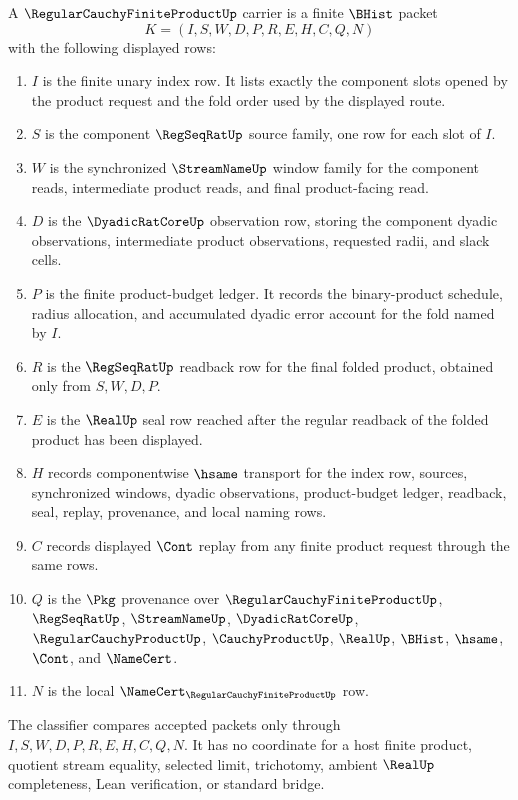 \begin{definition}\label{def:regular-cauchy-finite-product-carrier}
A $\RegularCauchyFiniteProductUp$ carrier is a finite $\BHist$ packet
$$
K=(I,S,W,D,P,R,E,H,C,Q,N)
$$
with the following displayed rows:
\begin{enumerate}
\item $I$ is the finite unary index row. It lists exactly the component slots opened by the product request and the fold order used by the displayed route.
\item $S$ is the component $\RegSeqRatUp$ source family, one row for each slot of $I$.
\item $W$ is the synchronized $\StreamNameUp$ window family for the component reads, intermediate product reads, and final product-facing read.
\item $D$ is the $\DyadicRatCoreUp$ observation row, storing the component dyadic observations, intermediate product observations, requested radii, and slack cells.
\item $P$ is the finite product-budget ledger. It records the binary-product schedule, radius allocation, and accumulated dyadic error account for the fold named by $I$.
\item $R$ is the $\RegSeqRatUp$ readback row for the final folded product, obtained only from $S,W,D,P$.
\item $E$ is the $\RealUp$ seal row reached after the regular readback of the folded product has been displayed.
\item $H$ records componentwise $\hsame$ transport for the index row, sources, synchronized windows, dyadic observations, product-budget ledger, readback, seal, replay, provenance, and local naming rows.
\item $C$ records displayed $\Cont$ replay from any finite product request through the same rows.
\item $Q$ is the $\Pkg$ provenance over $\RegularCauchyFiniteProductUp$, $\RegSeqRatUp$, $\StreamNameUp$, $\DyadicRatCoreUp$, $\RegularCauchyProductUp$, $\CauchyProductUp$, $\RealUp$, $\BHist$, $\hsame$, $\Cont$, and $\NameCert$.
\item $N$ is the local $\NameCert_{\RegularCauchyFiniteProductUp}$ row.
\end{enumerate}
The classifier compares accepted packets only through $I,S,W,D,P,R,E,H,C,Q,N$. It has no coordinate for a host finite product, quotient stream equality, selected limit, trichotomy, ambient $\RealUp$ completeness, Lean verification, or standard bridge.
\end{definition}


